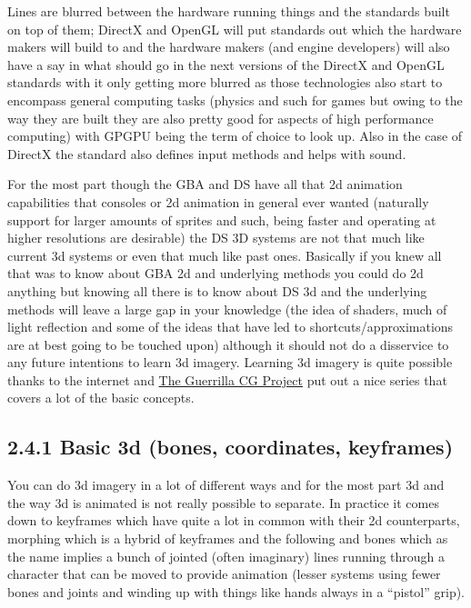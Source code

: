 \documentclass[
]{book}
\begin{document}
Lines are blurred between the hardware running things and the standards built on top of them; DirectX and OpenGL will put standards out which the hardware makers will build to and the hardware makers (and engine developers) will also have a say in what should go in the next versions of the DirectX and OpenGL standards with it only getting more blurred as those technologies also start to encompass general computing tasks (physics and such for games but owing to the way they are built they are also pretty good for aspects of high performance computing) with GPGPU being the term of choice to look up. Also in the case of DirectX the standard also defines input methods and helps with sound.

For the most part though the GBA and DS have all that 2d animation capabilities that consoles or 2d animation in general ever wanted (naturally support for larger amounts of sprites and such, being faster and operating at higher resolutions are desirable) the DS 3D systems are not that much like current 3d systems or even that much like past ones. Basically if you knew all that was to know about GBA 2d and underlying methods you could do 2d anything but knowing all there is to know about DS 3d and the underlying methods will leave a large gap in your knowledge (the idea of shaders, much of light reflection and some of the ideas that have led to shortcuts/approximations are at best going to be touched upon) although it should not do a disservice to any future intentions to learn 3d imagery. Learning 3d imagery is quite possible thanks to the internet and \href{http://www.youtube.com/playlist?list=PL6A7DF3D7866EB076\&feature=plpp}{The Guerrilla CG Project} put out a nice series that covers a lot of the basic concepts.

\hypertarget{basic-3d-bones-coordinates-keyframes}{%
\subsection{2.4.1 Basic 3d (bones, coordinates, keyframes)}\label{basic-3d-bones-coordinates-keyframes}}

You can do 3d imagery in a lot of different ways and for the most part 3d and the way 3d is animated is not really possible to separate. In practice it comes down to keyframes which have quite a lot in common with their 2d counterparts, morphing which is a hybrid of keyframes and the following and bones which as the name implies a bunch of jointed (often imaginary) lines running through a character that can be moved to provide animation (lesser systems using fewer bones and joints and winding up with things like hands always in a ``pistol'' grip).
\end{document}
